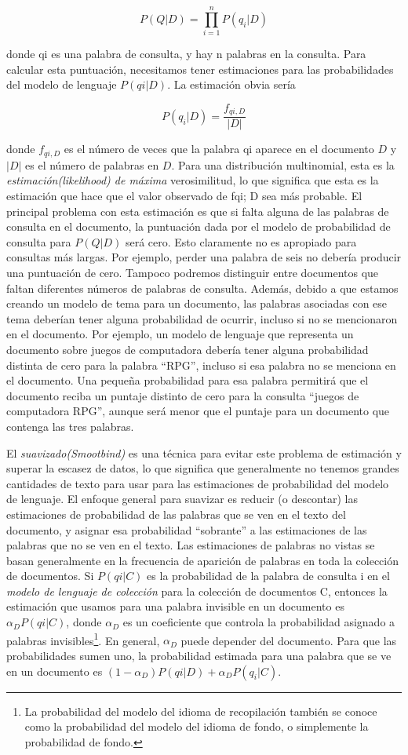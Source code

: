 $$P(Q|D) = \prod_{i=1}^{n}P(q_i|D)$$

donde qi es una palabra de consulta, y hay n palabras en la consulta. Para calcular esta puntuación, necesitamos tener estimaciones para las probabilidades del modelo de lenguaje $P (qi | D)$. La estimación obvia sería

$$P(q_i|D) = \frac{f_{qi,D}}{|D|}$$

donde $f_{qi, D}$ es el número de veces que la palabra qi aparece en el documento $D$ y $| D |$ es el número de palabras en $D$. Para una distribución multinomial, esta es la \textit{estimación(likelihood) de máxima} verosimilitud, lo que significa que esta es la estimación que hace que el valor observado de fqi; D sea más probable. El principal problema con esta estimación es que si falta alguna de las palabras de consulta en el documento, la puntuación dada por el modelo de probabilidad de consulta para $P (Q | D)$ será cero. Esto claramente no es apropiado para consultas más largas. Por ejemplo, perder una palabra de seis no debería producir una puntuación de cero. Tampoco podremos distinguir entre documentos que faltan diferentes números de palabras de consulta. Además, debido a que estamos creando un modelo de tema para un documento, las palabras asociadas con ese tema deberían tener alguna probabilidad de ocurrir, incluso si no se mencionaron en el documento. Por ejemplo, un modelo de lenguaje que representa un documento sobre juegos de computadora debería tener alguna probabilidad distinta de cero para la palabra ``RPG'', incluso si esa palabra no se menciona en el documento. Una pequeña probabilidad para esa palabra permitirá que el documento reciba un puntaje distinto de cero para la consulta ``juegos de computadora RPG'', aunque será menor que el puntaje para un documento que contenga las tres palabras.

El \textit{suavizado(Smootbind)} es una técnica para evitar este problema de estimación y superar la escasez de datos, lo que significa que generalmente no tenemos grandes cantidades de texto para usar para las estimaciones de probabilidad del modelo de lenguaje. El enfoque general para suavizar es reducir (o descontar) las estimaciones de probabilidad de las palabras que se ven en el texto del documento, y asignar esa probabilidad ``sobrante'' a las estimaciones de las palabras que no se ven en el texto. Las estimaciones de palabras no vistas se basan generalmente en la frecuencia de aparición de palabras en toda la colección de documentos. Si $P (qi | C)$ es la probabilidad de la palabra de consulta i en el \textit{modelo de lenguaje de colección} para la colección de documentos C, entonces la estimación que usamos para una palabra invisible en un documento es $\alpha_D P (qi | C)$, donde $\alpha_D$ es un coeficiente que controla la probabilidad asignado a palabras invisibles\footnote{La probabilidad del modelo del idioma de recopilación también se conoce como la probabilidad del modelo del idioma de fondo, o simplemente la probabilidad de fondo.}. En general, $\alpha_D$ puede depender del documento. Para que las probabilidades sumen uno, la probabilidad estimada para una palabra que se ve en un documento es $(1 - \alpha_D) P (qi | D) + \alpha_D P (q_i | C)$.

